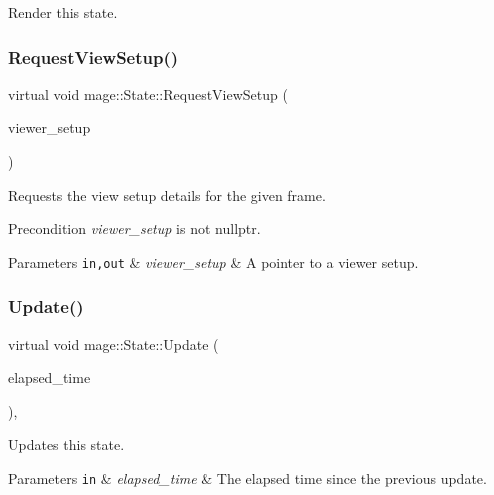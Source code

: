 Render this state. \hypertarget{classmage_1_1_state_a352431f7b9c067bc45f922b782d6b407}{}\label{classmage_1_1_state_a352431f7b9c067bc45f922b782d6b407} 
\subsubsection{\texorpdfstring{Request\+View\+Setup()}{RequestViewSetup()}}
{\footnotesize\ttfamily virtual void mage\+::\+State\+::\+Request\+View\+Setup (\begin{DoxyParamCaption}\item[{\hyperlink{structmage_1_1_viewer_setup}{Viewer\+Setup} $\ast$}]{viewer\+\_\+setup }\end{DoxyParamCaption})\hspace{0.3cm}{\ttfamily [virtual]}}

Requests the view setup details for the given frame.

\begin{DoxyPrecond}{Precondition}
{\itshape viewer\+\_\+setup} is not {\ttfamily nullptr}. 
\end{DoxyPrecond}

\begin{DoxyParams}[1]{Parameters}
\mbox{\tt in,out}  & {\em viewer\+\_\+setup} & A pointer to a viewer setup. \\
\hline
\end{DoxyParams}
\hypertarget{classmage_1_1_state_afbee8caa84e0c69ac5757f7e5e87317f}{}\label{classmage_1_1_state_afbee8caa84e0c69ac5757f7e5e87317f} 
\subsubsection{\texorpdfstring{Update()}{Update()}}
{\footnotesize\ttfamily virtual void mage\+::\+State\+::\+Update (\begin{DoxyParamCaption}\item[{double}]{elapsed\+\_\+time }\end{DoxyParamCaption})\hspace{0.3cm}{\ttfamily [protected]}, {\ttfamily [virtual]}}

Updates this state.


\begin{DoxyParams}[1]{Parameters}
\mbox{\tt in}  & {\em elapsed\+\_\+time} & The elapsed time since the previous update. \\
\hline
\end{DoxyParams}


